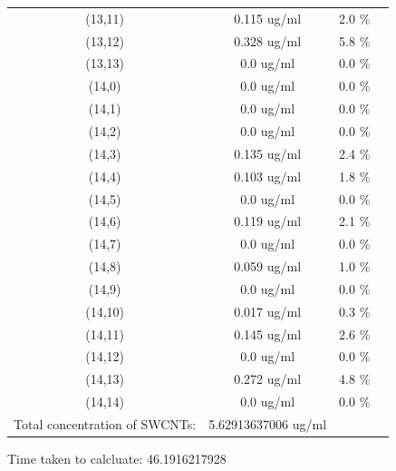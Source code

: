 \documentclass{article}
\begin{document}
\begin{tabular}{c c c c}
(13,11)&        0.115 ug/ml        &2.0 \%\\
(13,12)&        0.328 ug/ml        &5.8 \%\\
(13,13)&        0.0 ug/ml        &0.0 \%\\
(14,0)&        0.0 ug/ml        &0.0 \%\\
(14,1)&        0.0 ug/ml        &0.0 \%\\
(14,2)&        0.0 ug/ml        &0.0 \%\\
(14,3)&        0.135 ug/ml        &2.4 \%\\
(14,4)&        0.103 ug/ml        &1.8 \%\\
(14,5)&        0.0 ug/ml        &0.0 \%\\
(14,6)&        0.119 ug/ml        &2.1 \%\\
(14,7)&        0.0 ug/ml        &0.0 \%\\
(14,8)&        0.059 ug/ml        &1.0 \%\\
(14,9)&        0.0 ug/ml        &0.0 \%\\
(14,10)&        0.017 ug/ml        &0.3 \%\\
(14,11)&        0.145 ug/ml        &2.6 \%\\
(14,12)&        0.0 ug/ml        &0.0 \%\\
(14,13)&        0.272 ug/ml        &4.8 \%\\
(14,14)&        0.0 ug/ml        &0.0 \%\\
Total concentration of SWCNTs: &5.62913637006 ug/ml\\

\end{tabular}Time taken to calcluate: 46.1916217928
\end{document}
